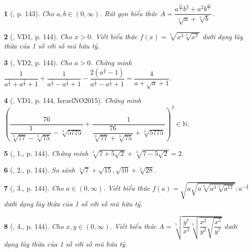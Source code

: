 \documentclass{article}
\newtheorem{baitoan}{}
\begin{document}
\begin{baitoan}[\cite{BTNC_Toan_11_DSGTXSTK}, p. 143]
	Cho $a,b\in(0,\infty)$. Rút gọn biểu thức $A = \dfrac{a^{\frac{11}{5}}b^2 + a^2b^{\frac{11}{5}}}{\sqrt[5]{a} + \sqrt[5]{b}}$.
\end{baitoan}

\begin{baitoan}[\cite{BTNC_Toan_11_DSGTXSTK}, VD1, p. 144]
	Cho $x > 0$. Viết biểu thức $f(x) = \sqrt[7]{x^3\sqrt[5]{x^2}}$ dưới dạng lũy thừa của 1 số với số mũ hữu tỷ.
\end{baitoan}

\begin{baitoan}[\cite{BTNC_Toan_11_DSGTXSTK}, VD2, p. 144]
	Cho $a > 0$. Chứng minh $\dfrac{1}{a^{\frac{1}{4}} + a^{\frac{1}{8}} + 1} + \dfrac{1}{a^{\frac{1}{4}} - a^{\frac{1}{8}} + 1} - \dfrac{2\left(a^{\frac{1}{4}} - 1\right)}{a^{\frac{1}{2}} - a^{\frac{1}{4}} + 1} = \dfrac{4}{a + \sqrt{a} + 1}$.
\end{baitoan}

\begin{baitoan}[\cite{BTNC_Toan_11_DSGTXSTK}, VD1, p. 144, IsraelNO2015]
	Chứng minh $\left(\dfrac{76}{\dfrac{1}{\sqrt[3]{77} - \sqrt[3]{75}} - \sqrt[3]{5775}} + \dfrac{1}{\dfrac{76}{\sqrt[3]{77} + \sqrt[3]{75}} + \sqrt[3]{5775}}\right)^3\in\mathbb{N}$.
\end{baitoan}

\begin{baitoan}[\cite{BTNC_Toan_11_DSGTXSTK}, 1., p. 144]
	Chứng minh $\sqrt[3]{7 + 5\sqrt{2}} + \sqrt[3]{7 - 5\sqrt{2}} = 2$.
\end{baitoan}

\begin{baitoan}[\cite{BTNC_Toan_11_DSGTXSTK}, 2., p. 144]
	So sánh $\sqrt[3]{7} + \sqrt{15},\sqrt{10} + \sqrt[3]{28}$.
\end{baitoan}

\begin{baitoan}[\cite{BTNC_Toan_11_DSGTXSTK}, 3., p. 144]
	Cho $a\in(0,\infty)$. Viết biểu thức $f(a) = \sqrt{a\sqrt{a\sqrt[3]{a^3\sqrt[5]{a^{12}}}}}:a^{-\frac{4}{5}}$ dưới dạng lũy thừa của 1 số với số mũ hữu tỷ.
\end{baitoan}

\begin{baitoan}[\cite{BTNC_Toan_11_DSGTXSTK}, 4., p. 144]
	Cho $x,y\in(0,\infty)$. Viết biểu thức $A = \sqrt[5]{\dfrac{y^7}{x^3}\sqrt[3]{\dfrac{x^2}{y^2}\sqrt{\dfrac{x^5}{y^7}}}}$ dưới dạng lũy thừa của 1 số với số mũ hữu tỷ.
\end{baitoan}
\end{document}
